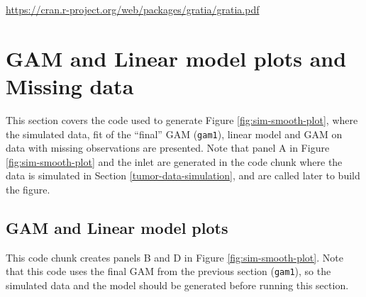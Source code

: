 \documentclass[
]{article}
\newcommand{\passthrough}[1]{#1}
\begin{document}
\url{https://cran.r-project.org/web/packages/gratia/gratia.pdf}

\hypertarget{gam-and-linear-model-plots-and-missing-data}{%
\section{GAM and Linear model plots and Missing data}\label{gam-and-linear-model-plots-and-missing-data}}

This section covers the code used to generate Figure \ref{fig:sim-smooth-plot}, where the simulated data, fit of the ``final'' GAM (\passthrough{\lstinline!gam1!}), linear model and GAM on data with missing observations are presented. Note that panel A in Figure \ref{fig:sim-smooth-plot} and the inlet are generated in the code chunk where the data is simulated in Section \ref{tumor-data-simulation}, and are called later to build the figure.

\hypertarget{gam-and-linear-model-plots}{%
\subsection{GAM and Linear model plots}\label{gam-and-linear-model-plots}}

This code chunk creates panels B and D in Figure \ref{fig:sim-smooth-plot}. Note that this code uses the final GAM from the previous section (\passthrough{\lstinline!gam1!}), so the simulated data and the model should be generated before running this section.
\end{document}
